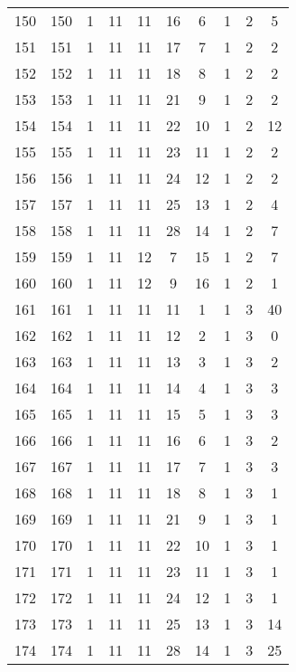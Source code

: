 \begin{longtable}{cccccccccc}
  150 & 150 &   1 &  11 &  11 &  16 &   6 &   1 &   2 &   5 \\ 
  151 & 151 &   1 &  11 &  11 &  17 &   7 &   1 &   2 &   2 \\ 
  152 & 152 &   1 &  11 &  11 &  18 &   8 &   1 &   2 &   2 \\ 
  153 & 153 &   1 &  11 &  11 &  21 &   9 &   1 &   2 &   2 \\ 
  154 & 154 &   1 &  11 &  11 &  22 &  10 &   1 &   2 &  12 \\ 
  155 & 155 &   1 &  11 &  11 &  23 &  11 &   1 &   2 &   2 \\ 
  156 & 156 &   1 &  11 &  11 &  24 &  12 &   1 &   2 &   2 \\ 
  157 & 157 &   1 &  11 &  11 &  25 &  13 &   1 &   2 &   4 \\ 
  158 & 158 &   1 &  11 &  11 &  28 &  14 &   1 &   2 &   7 \\ 
  159 & 159 &   1 &  11 &  12 &   7 &  15 &   1 &   2 &   7 \\ 
  160 & 160 &   1 &  11 &  12 &   9 &  16 &   1 &   2 &   1 \\ 
  161 & 161 &   1 &  11 &  11 &  11 &   1 &   1 &   3 &  40 \\ 
  162 & 162 &   1 &  11 &  11 &  12 &   2 &   1 &   3 &   0 \\ 
  163 & 163 &   1 &  11 &  11 &  13 &   3 &   1 &   3 &   2 \\ 
  164 & 164 &   1 &  11 &  11 &  14 &   4 &   1 &   3 &   3 \\ 
  165 & 165 &   1 &  11 &  11 &  15 &   5 &   1 &   3 &   3 \\ 
  166 & 166 &   1 &  11 &  11 &  16 &   6 &   1 &   3 &   2 \\ 
  167 & 167 &   1 &  11 &  11 &  17 &   7 &   1 &   3 &   3 \\ 
  168 & 168 &   1 &  11 &  11 &  18 &   8 &   1 &   3 &   1 \\ 
  169 & 169 &   1 &  11 &  11 &  21 &   9 &   1 &   3 &   1 \\ 
  170 & 170 &   1 &  11 &  11 &  22 &  10 &   1 &   3 &   1 \\ 
  171 & 171 &   1 &  11 &  11 &  23 &  11 &   1 &   3 &   1 \\ 
  172 & 172 &   1 &  11 &  11 &  24 &  12 &   1 &   3 &   1 \\ 
  173 & 173 &   1 &  11 &  11 &  25 &  13 &   1 &   3 &  14 \\ 
  174 & 174 &   1 &  11 &  11 &  28 &  14 &   1 &   3 &  25 \\ 

\end{longtable}
